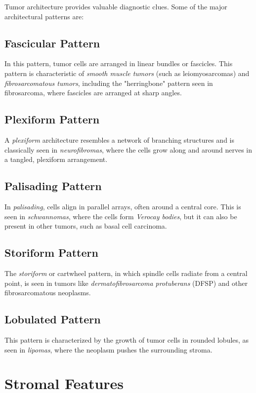 Tumor architecture provides valuable diagnostic clues. Some of the major architectural patterns are:

\subsection{Fascicular Pattern}
In this pattern, tumor cells are arranged in linear bundles or fascicles. This pattern is characteristic of \emph{smooth muscle tumors} (such as leiomyosarcomas) and \emph{fibrosarcomatous tumors}, including the "herringbone" pattern seen in fibrosarcoma, where fascicles are arranged at sharp angles.

\subsection{Plexiform Pattern}
A \emph{plexiform} architecture resembles a network of branching structures and is classically seen in \emph{neurofibromas}, where the cells grow along and around nerves in a tangled, plexiform arrangement.

\subsection{Palisading Pattern}
In \emph{palisading}, cells align in parallel arrays, often around a central core. This is seen in \emph{schwannomas}, where the cells form \emph{Verocay bodies}, but it can also be present in other tumors, such as basal cell carcinoma.

\subsection{Storiform Pattern}
The \emph{storiform} or cartwheel pattern, in which spindle cells radiate from a central point, is seen in tumors like \emph{dermatofibrosarcoma protuberans} (DFSP) and other fibrosarcomatous neoplasms.

\subsection{Lobulated Pattern}
This pattern is characterized by the growth of tumor cells in rounded lobules, as seen in \emph{lipomas}, where the neoplasm pushes the surrounding stroma.

\section{Stromal Features}

